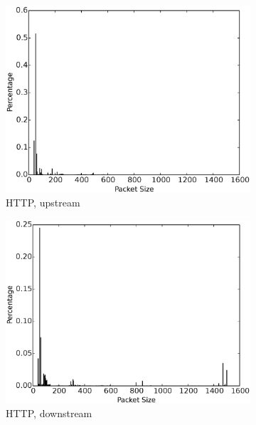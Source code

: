 \begin{figure}
\begin{subfigure}{.24\linewidth}
\includegraphics[width=\linewidth]{image/http_pkt_size_upstream.eps}
\caption{HTTP, upstream}
\label{fig:http_pkt_size_upstream}
\end{subfigure}
\begin{subfigure}{.24\linewidth}
\centering
\includegraphics[width=\linewidth]{image/http_pkt_size_downstream.eps}
\caption{HTTP, downstream}
\label{fig:http_pkt_size_downstream}
\end{subfigure}
\begin{subfigure}{.24\linewidth}
\centering

\end{subfigure}
\end{figure}
